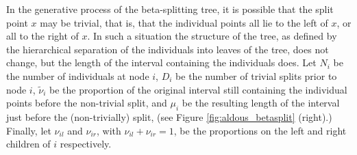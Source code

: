 \documentclass{bioinfo}
\newcommand{\nut}{\tilde{\nu}}
\newcommand{\Beta}{\mathrm{Beta} }
\newcommand{\ancestors}{\mathrm{An} }
\newcommand{\Uniform}{\mathrm{Uniform} }
\begin{document}
\begin{methods}
%
%
%

In the generative process of the beta-splitting tree, it is possible that the split point $x$ may be trivial, that is, that the individual points all lie to the left of $x$, or all to the right of $x$.  In such a situation the structure of the tree, as defined by the hierarchical separation of the individuals into leaves of the tree, does not change, but the length of the interval containing the individuals does.  Let $N_i$ be the number of individuals at node $i$, $D_i$ be the number of trivial splits prior to node $i$, $\tilde{\nu}_i$ be the proportion of the original interval still containing the individual points before the non-trivial split, and $\mu_i$ be the resulting length of the interval just before the (non-trivially) split, (see Figure \ref{fig:aldous_betasplit} (right).)  Finally, let $\nu_{il}$ and $\nu_{ir}$, with $\nu_{il}+\nu_{ir}=1$, be the proportions on the left and right children of $i$ respectively.


\end{methods}
\end{document}
